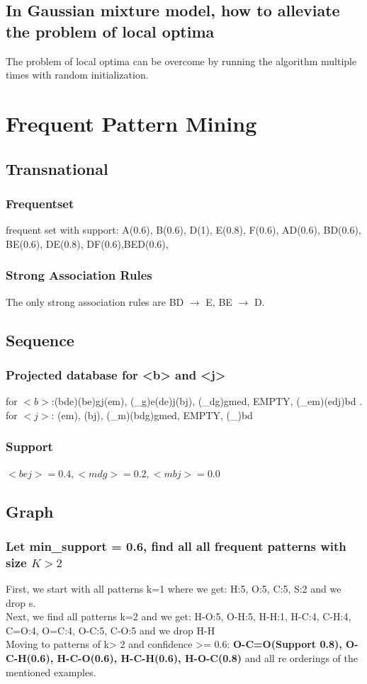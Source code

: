 \documentclass[11pt]{article}
\begin{document}
\subsection{In Gaussian mixture model, how to alleviate the problem of local optima}
The problem of local optima can be overcome by running the algorithm multiple times with random initialization. 
\section{Frequent Pattern Mining}
\subsection{Transnational}
\subsubsection{Frequentset}
frequent set with support: A(0.6), B(0.6), D(1), E(0.8), F(0.6), AD(0.6), BD(0.6), BE(0.6), DE(0.8), DF(0.6),BED(0.6),
\subsubsection{Strong Association Rules}
The only strong association rules are BD $\rightarrow$ E, BE $\rightarrow$ D. 
\subsection{Sequence}
\subsubsection{Projected database for <b> and <j>}
for $<b>$:(bde)(be)gj(em), (\_g)e(de)j(bj), (\_dg)gmed, EMPTY, (\_em)(edj)bd . \\
for $<j>$: (em), (bj), (\_m)(bdg)gmed, EMPTY, (\_)bd
\subsubsection{Support}
$<bej>=0.4, <mdg>=0.2, <mbj>=0.0$
\subsection{Graph}
\subsubsection{Let min\_support = 0.6, find all all frequent patterns with size $K > 2$}
First, we start with all patterns k=1 where we get: H:5, O:5, C:5, S:2 and we drop s. \\
Next, we find all patterns k=2 and we get: H-O:5, O-H:5, H-H:1, H-C:4, C-H:4, C=O:4, O=C:4, O-C:5, C-O:5 and we drop H-H \\
Moving to patterns of k> 2 and confidence >= 0.6: \textbf{O-C=O(Support 0.8), O-C-H(0.6), H-C-O(0.6), H-C-H(0.6), H-O-C(0.8)} and all re orderings of the mentioned examples. 
\end{document}
